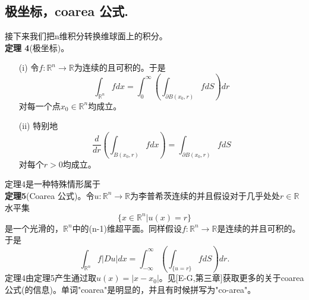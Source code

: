 \documentclass[leqno]{article}%
\begin{document}
\subsection{极坐标，coarea 公式.}
接下来我们把n维积分转换维球面上的积分。\\
\textbf{定理 4}(极坐标)。
\begin{enumerate}[fullwidth,itemindent=2em]
	\item[(i)]令$f:\mathbb{R}^{n}\rightarrow\mathbb{R}$为连续的且可积的。于是
	\begin{equation*}
	\int_{\mathbb{R}^{n}}fdx=\int_{0}^{\infty}\left(\int_{\partial B\left(x_{0},r\right)}fdS\right)dr
	\end{equation*} 
	对每一个点$x_{0}\in\mathbb{R}^{n}$均成立。
	\item[(ii)]特别地
	\begin{equation}
	\frac{d}{dr}\left(\int_{B\left(x_{0},r\right)}fdx\right)=\int_{\partial B\left(x_{0},r\right)}fdS\tag{ii}
	\end{equation}
	对每个$r>0$均成立。
	
\end{enumerate}
定理4是一种特殊情形属于\\
\textbf{定理5}(Coarea 公式)。令$u:\mathbb{R}^{n}\rightarrow\mathbb{R}$为李普希茨连续的并且假设对于几乎处处$r\in\mathbb{R}$水平集
\begin{equation*}
\{x\in\mathbb{R}^{n}|u(x)=r\}
\end{equation*}
是一个光滑的，$\mathbb{R}^{n}$中的(n-1)维超平面。同样假设$f:\mathbb{R}^{n}\rightarrow\mathbb{R}$是连续的并且可积的。于是
\begin{equation*}
\int_{\mathbb{R}^{n}}f|Du|dx=\int_{-\infty}^{\infty}\left(\int_{\{u=r\}}fdS\right)dr.
\end{equation*}
定理4由定理5产生通过取$u(x)=|x-x_{0}|$。见[E-G,第三章]获取更多的关于coarea公式(的信息)。单词"coarea"是明显的，并且有时候拼写为"co-area"。
\end{document}
